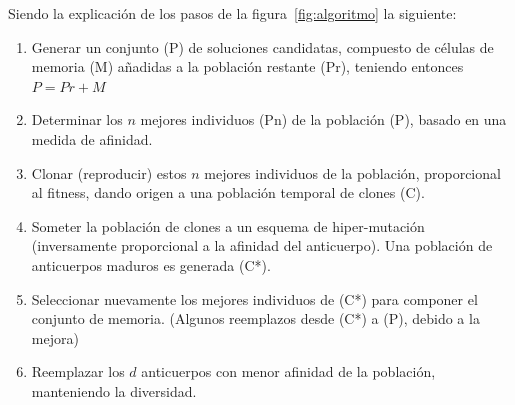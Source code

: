 Siendo la explicación de los pasos de la figura~\ref{fig:algoritmo} la siguiente:
\begin{enumerate}
    \item Generar un conjunto (P) de soluciones candidatas, compuesto de células de memoria (M) añadidas a la población restante (Pr), teniendo entonces $P = Pr + M$
    \item Determinar los $n$ mejores individuos (Pn) de la población (P), basado en una medida de afinidad.
    \item Clonar (reproducir) estos $n$ mejores individuos de la población, proporcional al fitness, dando origen a una población temporal de clones (C).
    \item Someter la población de clones a un esquema de hiper-mutación (inversamente proporcional a la afinidad del anticuerpo). Una población de anticuerpos maduros es generada (C*).
    \item Seleccionar nuevamente los mejores individuos de (C*) para componer el conjunto de memoria. (Algunos reemplazos desde (C*) a (P), debido a la mejora)
    \item Reemplazar los $d$ anticuerpos con menor afinidad de la población, manteniendo la diversidad.
\end{enumerate}

